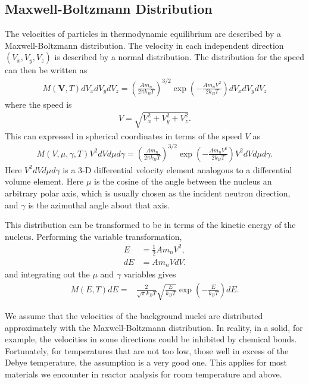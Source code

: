 \subsection{Maxwell-Boltzmann Distribution}

The velocities of particles in thermodynamic equilibrium are described by a Maxwell-Boltzmann distribution. The velocity in each independent direction $(V_x,V_y,V_z)$ is described by a normal distribution. The distribution for the speed can then be written as
\begin{align}
  M(\mathbf{V},T) dV_x dV_y dV_z 
  = \left( \frac{ A m_n }{ 2 \pi k_B T } \right)^{3/2} \exp \left( -\frac{ A m_n V^2 }{ 2 k_B T } \right) dV_x dV_y dV_z
\end{align}
where the speed is
\begin{align}
  V = \sqrt{ V_x^2 + V_y^2 + V_z^2 } .
\end{align}
This can expressed in spherical coordinates in terms of the speed $V$ as
\begin{align}
  M(V,\mu,\gamma,T) V^2 dV d\mu d\gamma 
  = \left( \frac{Am_n}{2\pi k_B T} \right)^{3/2} \exp \left( -\frac{ A m_n V^2 }{ 2 k_B T } \right) V^2 dV d\mu d\gamma.
\end{align}
Here $V^2 dV d\mu d\gamma$ is a 3-D differential velocity element analogous to a differential volume element. Here $\mu$ is the cosine of the angle between the nucleus an arbitrary polar axis, which is usually chosen as the incident neutron direction, and $\gamma$ is the azimuthal angle about that axis.

This distribution can be transformed to be in terms of the kinetic energy of the nucleus. Performing the variable transformation,
\begin{align}
  E &= \frac{1}{2} A m_n V^2, \nonumber \\
  dE &= A m_n V dV . \nonumber
\end{align}
and integrating out the $\mu$ and $\gamma$ variables gives
\begin{align}
  M(E,T) dE 
  = &\frac{2}{\sqrt{\pi} k_B T} \sqrt{ \frac{E}{k_B T} } \exp \left( -\frac{ E }{ k_B T } \right) dE.
\end{align}

We assume that the velocities of the background nuclei are distributed approximately with the Maxwell-Boltzmann distribution. In reality, in a solid, for example, the velocities in some directions could be inhibited by chemical bonds. Fortunately, for temperatures that are not too low, those well in excess of the Debye temperature, the assumption is a very good one. This applies for most materials we encounter in reactor analysis for room temperature and above.

